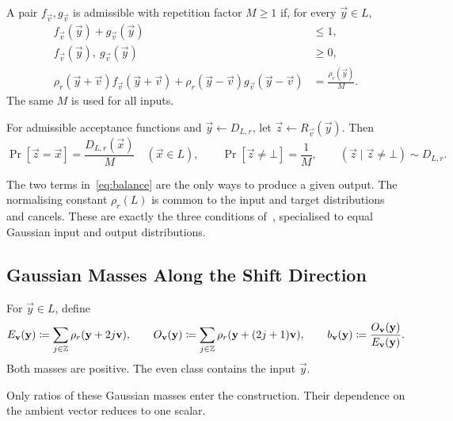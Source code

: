 \begin{definition}
\label{def:admissible}
A pair $f_{\vec v},g_{\vec v}$ is admissible with repetition factor $M\ge1$ if, for every $\vec y\in L$,
\begin{align}
 f_{\vec v}(\vec y)+g_{\vec v}(\vec y)&\le1,\label{eq:budget}\\
 f_{\vec v}(\vec y),\ g_{\vec v}(\vec y)&\ge0,\label{eq:positive}\\
 \rho_r(\vec y+\vec v)f_{\vec v}(\vec y+\vec v)+\rho_r(\vec y-\vec v)g_{\vec v}(\vec y-\vec v)&=\frac{\rho_r(\vec y)}M.\label{eq:balance}
\end{align}
The same $M$ is used for all inputs.
\end{definition}

\begin{lemma}
\label{lem:output}
For admissible acceptance functions and $\vec y\leftarrow D_{L,r}$, let $\vec z\leftarrow R_{\vec v}(\vec y)$. Then
\[
 \Pr[\vec z=\vec x]=\frac{D_{L,r}(\vec x)}M\quad(\vec x\in L),
 \qquad
 \Pr[\vec z\ne\bot]=\frac1M,
 \qquad
 (\vec z\mid\vec z\ne\bot)\sim D_{L,r}.
\]
\end{lemma}

The two terms in~\cref{eq:balance} are the only ways to produce a given output. The normalising constant $\rho_r(L)$ is common to the input and target distributions and cancels. These are exactly the three conditions of~\cite{GartnerFull}, specialised to equal Gaussian input and output distributions.

\subsection{Gaussian Masses Along the Shift Direction}

\begin{definition}
\label{def:parity}
For $\vec y\in L$, define
\[
 E_{\mathbf{v}}(\mathbf{y})\coloneqq\sum_{j\in\mathbb{Z}}\rho_r(\mathbf{y}+2j\mathbf{v}),
 \qquad
 O_{\mathbf{v}}(\mathbf{y})\coloneqq\sum_{j\in\mathbb{Z}}\rho_r(\mathbf{y}+(2j+1)\mathbf{v}),
 \qquad
 b_{\mathbf{v}}(\mathbf{y})\coloneqq\frac{O_{\mathbf{v}}(\mathbf{y})}{E_{\mathbf{v}}(\mathbf{y})}.
\]
Both masses are positive. The even class contains the input $\vec y$.
\end{definition}

Only ratios of these Gaussian masses enter the construction. Their dependence on the ambient vector reduces to one scalar.

